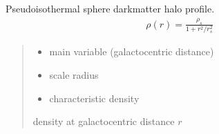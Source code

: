 \documentclass[letterpaper,10pt,english]{sphinxmanual}
\begin{document}
\begin{fulllineitems}
\label{\detokenize{diffsph.profiles:diffsph.profiles.templates.ps_iso}}
\pysigstartsignatures
{}
\pysigstopsignatures
\sphinxAtStartPar
Pseudo\sphinxhyphen{}isothermal sphere dark\sphinxhyphen{}matter halo profile.
\begin{equation*}
\begin{split}\rho(r) = \frac{\rho_s}{1+r^2/r_s^2}\end{split}
\end{equation*}\begin{quote}\begin{description}
\begin{itemize}
\item {} 
\sphinxAtStartPar
{} \textendash{} main variable (galactocentric distance)

\item {} 
\sphinxAtStartPar
{} \textendash{} scale radius

\item {} 
\sphinxAtStartPar
{} \textendash{} characteristic density

\end{itemize}

\sphinxAtStartPar
density at galactocentric distance \(r\)

\end{description}\end{quote}

\end{fulllineitems}

\end{document}
